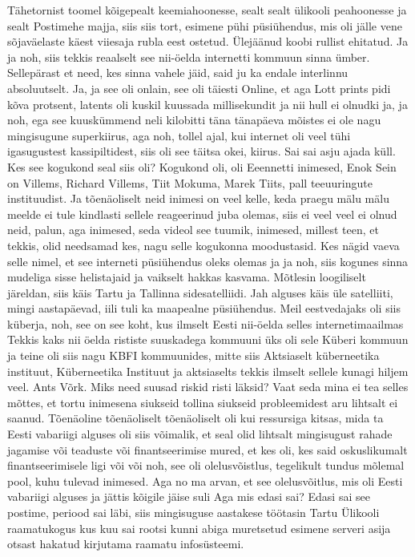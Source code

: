 Tähetornist toomel kõigepealt keemiahoonesse, sealt sealt ülikooli peahoonesse ja sealt Postimehe majja, siis siis tort, esimene pühi püsiühendus, mis oli jälle vene sõjaväelaste käest viiesaja rubla eest ostetud. Ülejäänud koobi rullist ehitatud.
Ja ja noh, siis tekkis reaalselt see nii-öelda internetti kommuun sinna ümber. Sellepärast et need, kes sinna vahele jäid, said ju ka endale interlinnu absoluutselt. Ja, ja see oli onlain, see oli täiesti Online, et aga Lott prints pidi kõva protsent, latents oli kuskil kuussada millisekundit ja nii hull ei olnudki ja, ja noh, ega see kuuskümmend neli kilobitti täna tänapäeva mõistes ei ole nagu mingisugune superkiirus, aga noh, tollel ajal, kui internet oli veel tühi igasugustest kassipiltidest, siis oli see täitsa okei, kiirus.
Sai sai asju ajada küll. Kes see kogukond seal siis oli?
Kogukond oli, oli Eeennetti inimesed, Enok Sein on Villems, Richard Villems, Tiit Mokuma, Marek Tiits, pall teeuuringute instituudist. Ja tõenäoliselt neid inimesi on veel kelle, keda praegu mälu mälu meelde ei tule kindlasti sellele reageerinud juba olemas, siis ei veel veel ei olnud neid, palun, aga inimesed, seda videol see tuumik, inimesed, millest teen, et tekkis, olid needsamad kes, nagu selle kogukonna moodustasid. Kes nägid vaeva selle nimel, et see interneti püsiühendus oleks olemas ja ja noh, siis kogunes sinna mudeliga sisse helistajaid ja vaikselt hakkas kasvama.
Mõtlesin loogiliselt järeldan, siis käis Tartu ja Tallinna sidesatelliidi.
Jah alguses käis üle satelliiti, mingi aastapäevad, iili tuli ka maapealne püsiühendus. Meil eestvedajaks oli siis küberja, noh, see on see koht, kus ilmselt Eesti nii-öelda selles internetimaailmas
Tekkis kaks nii öelda rististe suuskadega kommuuni üks oli sele Küberi kommuun ja teine oli siis nagu KBFI kommuunides, mitte siis Aktsiaselt küberneetika instituut, Küberneetika Instituut ja aktsiaselts tekkis ilmselt sellele kunagi hiljem veel. Ants Võrk.
Miks need suusad riskid risti läksid? Vaat seda mina ei tea selles mõttes, et tortu inimesena siukseid tollina siukseid probleemidest aru lihtsalt ei saanud. Tõenäoline tõenäoliselt tõenäoliselt oli kui ressursiga kitsas, mida ta Eesti vabariigi alguses oli siis võimalik, et seal olid lihtsalt mingisugust rahade jagamise või teaduste või finantseerimise mured, et kes oli, kes said oskuslikumalt finantseerimisele ligi või või noh, see oli olelusvõistlus, tegelikult tundus mõlemal pool, kuhu tulevad inimesed. Aga no ma arvan, et see olelusvõitlus, mis oli Eesti vabariigi alguses ja jättis kõigile jäise suli
Aga mis edasi sai? Edasi sai see postime, periood sai läbi, siis mingisuguse aastakese töötasin Tartu Ülikooli raamatukogus kus kuu sai rootsi kunni abiga muretsetud esimene serveri asija otsast hakatud kirjutama raamatu infosüsteemi.
